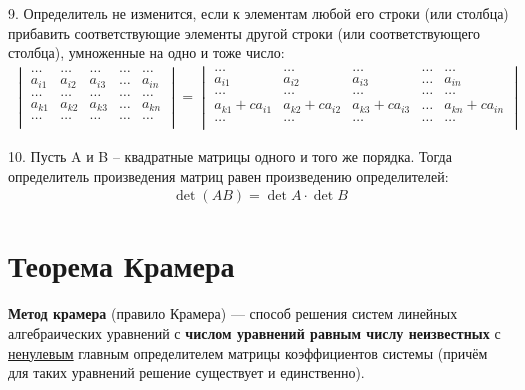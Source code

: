 \documentclass[a4paper,12pt]{extbook}
\theoremstyle{numbered}
\theoremstyle{named}
\theoremstyle{named}
\theoremstyle{named}
\begin{document}
9. Определитель не изменится, если к элементам любой его строки (или столбца) прибавить соответствующие элементы другой строки (или соответствующего столбца), умноженные на одно и тоже число:
\begin{gather*}
    \begin{vmatrix}
        \dots  & \dots  & \dots  & \dots & \dots  \\
        a_{i1} & a_{i2} & a_{i3} & \dots & a_{in} \\
        \dots  & \dots  & \dots  & \dots & \dots  \\
        a_{k1} & a_{k2} & a_{k3} & \dots & a_{kn} \\
        \dots  & \dots  & \dots  & \dots & \dots  \\
    \end{vmatrix}
    =
    \begin{vmatrix}
        \dots            & \dots            & \dots            & \dots & \dots            \\
        a_{i1}           & a_{i2}           & a_{i3}           & \dots & a_{in}           \\
        \dots            & \dots            & \dots            & \dots & \dots            \\
        a_{k1} + ca_{i1} & a_{k2} + ca_{i2} & a_{k3} + ca_{i3} & \dots & a_{kn} + ca_{in} \\
        \dots            & \dots            & \dots            & \dots & \dots            \\
    \end{vmatrix}
\end{gather*}

10. Пусть A и B – квадратные матрицы одного и того же порядка. Тогда определитель произведения матриц равен произведению определителей:
\begin{gather*}
    \det (AB) = \det A \cdot \det B
\end{gather*}

\section{Теорема Крамера}%
\label{sec:Теорема Крамера}

\textbf{Метод крамера} (правило Крамера) — способ решения систем линейных алгебраических уравнений с \textbf{числом уравнений равным числу неизвестных} с \underline{ненулевым} главным определителем матрицы коэффициентов системы (причём для таких уравнений решение существует и единственно).
\end{document}
